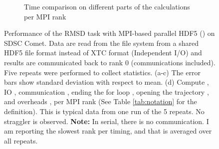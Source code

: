 \begin{figure}[ht!]
\begin{subfigure} {.5\textwidth}
  \caption{Time comparison on different parts of the calculations per MPI rank}
  \label{fig:MPIranks-hdf5}
\end{subfigure}
%
\caption{Performance of the RMSD task with MPI-based parallel HDF5 () on SDSC Comet.
Data are read from the file system from a shared HDF5 file format instead of XTC format (Independent I/O) and results are communicated back to rank 0 (communications included). 
Five repeats were performed to collect statistics. (a-c) The error bars show standard deviation with respect to mean. (d) Compute \tcomp, IO \tIO, communication \tcomm, ending the for loop ,
  opening the trajectory , and overheads ,  per MPI rank (See Table \ref{tab:notation} for the definition).
  This is typical data from one run of the 5 repeats. No straggler is observed. \textbf{Note:} In serial, there is no communication. I am reporting the slowest rank per timing, and that is averaged over all repeats.}
\label{fig:MPIwithIO-hdf5}
\end{figure}
